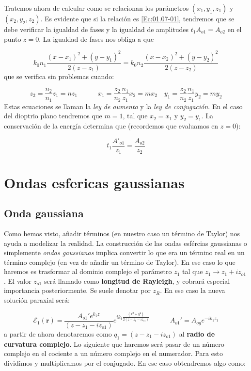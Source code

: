 \documentclass[12pt,a4paper]{book}
\numberwithin{equation}{section}
\numberwithin{figure}{section}
\newcommand{\tquad}{\quad \quad \quad}
\newcommand{\1}{_{(1)}}
\newcommand{\2}{_{(2)}}
\newcommand{\rn}{\mathbf{r}}
\theoremstyle{definition}
\begin{document}
Tratemos ahora de calcular como se relacionan los parámetros $(x_1,y_1,z_1)$ y $(x_2,y_2,z_2)$. Es evidente que si la relación es \ref{Ec:01.07-01}, tendremos que se debe verificar la igualdad de fases y la igualdad de amplitudes $t_1 A_{o1} = A_{o2}$ en el punto $z=0$. La igualdad de fases nos obliga a que 

$$ k_0 n_1 \frac{(x-x_1)^2+(y-y_1)^2}{2 (z-z_1)} = k_0 n_2 \frac{(x-x_2)^2 + (y-y_2)^2}{2 (z-z_2)} $$
que se verifica sin problemas cuando:

\begin{equation}
z_2 = \frac{n_2}{n_1} z_1 = n z_1 \tquad x_1 =  \frac{z_2}{n_2} \frac{n_1}{z_1} x_2 = m  x_2 \quad y_1 =  \frac{z_2}{n_2} \frac{n_1}{z_1} y_2 = m  y_2
\end{equation} 
Estas ecuaciones se llaman la \textit{ley de aumento} y la \textit{ley de conjugación}. En el caso del dioptrio plano tendremos que $m=1$, tal que $x_2 = x_1$ y $y_2 = y_1$. La conservación de la energía determina que (recordemos que evaluamos en $z=0$):

\begin{equation}
t_1 \frac{A'_{o1}}{z_1} =  \frac{A_{o2}}{z_2}
\end{equation}


\section{Ondas esfericas gaussianas}

\subsection{Onda gaussiana}

Como hemos visto, añadir términos (en nuestro caso un término de Taylor) nos ayuda a modelizar la realidad. La construcción de las ondas esfércias gaussianas o simplemente \textit{ondas gaussianas} implica convertir lo que era un término real en un término complejo (en vez de añadir un término de Taylor). En ese caso lo que haremos es trasformar al dominio complejo el parámetro $z_1$ tal que $z_1 \rightarrow z_1 + i z_{o1}$. El valor $z_{o1}$ será llamado como \textbf{longitud de Rayleigh}, y cobrará especial importancia posteriormente. Se suele denotar por $z_R$. En ese caso la nueva solución paraxial será:

\begin{equation}
\mathcal{E}_1 (\rn) = \dfrac{A_{o1}' e^{k_1 z}}{(z-z_1-iz_{o1})} e^{i k_1 \frac{(x^2+y^2)}{2(z-z_1-iz_{o1})}}  \tquad A_{o1}' = A_{og} e^{- i k_1 z_1} \label{Ec:01.09.1-Gauss}
\end{equation}
a partir de ahora denotaremos como $q_1 = (z-z_1-iz_{o1})$ al \textbf{radio de curvatura complejo}. Lo siguiente que haremos será pasar de un número complejo en el cociente a un número complejo en el numerador. Para esto dividimos y multiplicamos por el conjugado. En ese caso obtendremos algo como:
\end{document}
